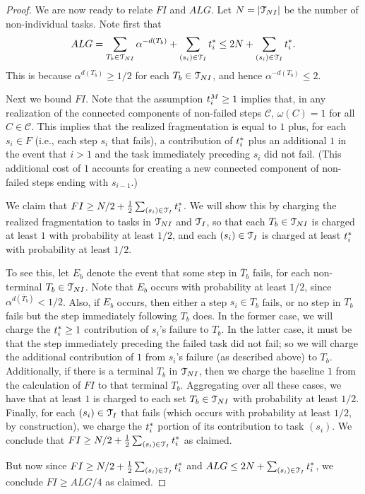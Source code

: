 \begin{proof}
    \medskip

    We are now ready to relate $FI$ and $ALG$.
    Let $N = |\mathcal{T}_{NI}|$ be the number of non-individual tasks.
    Note first that
    \[ ALG = \sum_{T_b \in \mathcal{T}_{NI}} \alpha^{-d(T_b)} + \sum_{(s_i) \in \mathcal{T}_I} t^*_{i} \leq 2N + \sum_{(s_i) \in \mathcal{T}_I} t^*_{i}. \]
    This is because $\alpha^{d(T_b)} \geq 1/2$ for each $T_b \in \mathcal{T}_{NI}$, and hence $\alpha^{-d(T_b)} \leq 2$.

    \medskip

    Next we bound $FI$.
    Note that the assumption $t^{M}_{i} \geq 1$ implies that, in any realization of the connected components of non-failed steps $\mathcal{C}$, $\omega(C) = 1$ for all $C \in \mathcal{C}$.
    This implies that the realized fragmentation is equal to $1$ plus, for each $s_i \in F$ (i.e., each step $s_i$ that fails), a contribution of $t^*_{i}$ plus an additional $1$ in the event that $i > 1$ and the task immediately preceding $s_i$ did not fail.
    (This additional cost of $1$ accounts for creating a new connected component of non-failed steps ending with $s_{i-1}$.)

    We claim that $FI \geq N/2 + \frac{1}{2}\sum_{(s_i) \in \mathcal{T}_I} t^*_{i}$.
    We will show this by charging  the realized fragmentation to tasks in $\mathcal{T}_{NI}$ and $\mathcal{T}_I$, so that each $T_b \in \mathcal{T}_{NI}$ is charged at least $1$ with probability at least $1/2$, and each $(s_i) \in \mathcal{T}_I$ is charged at least $t^*_{i}$ with probability at least $1/2$.

    To see this, let $E_b$ denote the event that some step in $\overline{T}_b$ fails, for each non-terminal $T_b \in \mathcal{T}_{NI}$.
    Note that $E_b$ occurs with probability at least $1/2$, since $\alpha^{d(\overline{T}_b)} < 1/2$.
    Also, if $E_b$ occurs, then either a step $s_i \in T_b$ fails, or no step in $T_b$ fails but the step immediately following $T_b$ does.
    In the former case, we will charge the $t^*_{i} \geq 1$ contribution of $s_i$'s failure to $T_b$.
    In the latter case, it must be that the step immediately preceding the failed task did not fail; so we will charge the additional contribution of $1$ from $s_i$'s failure (as described above) to $T_b$.
    Additionally, if there is a terminal $T_b$ in $\mathcal{T}_{NI}$, then we charge the baseline $1$ from the calculation of $FI$ to that terminal $T_b$.
    Aggregating over all these cases, we have that at least $1$ is charged to each set $T_b \in \mathcal{T}_{NI}$ with probability at least $1/2$.
    Finally, for each $(s_i) \in \mathcal{T}_I$ that fails (which occurs with probability at least $1/2$, by construction), we charge the $t^*_{i}$ portion of its contribution to task $(s_i)$.
    We conclude that $FI \geq N/2 + \frac{1}{2}\sum_{(s_i) \in \mathcal{T}_I}t^*_{i}$ as claimed.

    But now since $FI \geq N/2 + \frac{1}{2}\sum_{(s_i) \in \mathcal{T}_I}t^*_{i}$ and $ALG \leq 2N + \sum_{(s_i) \in \mathcal{T}_I}t^*_{i}$, we conclude $FI \geq ALG/4$ as claimed.
\end{proof}

